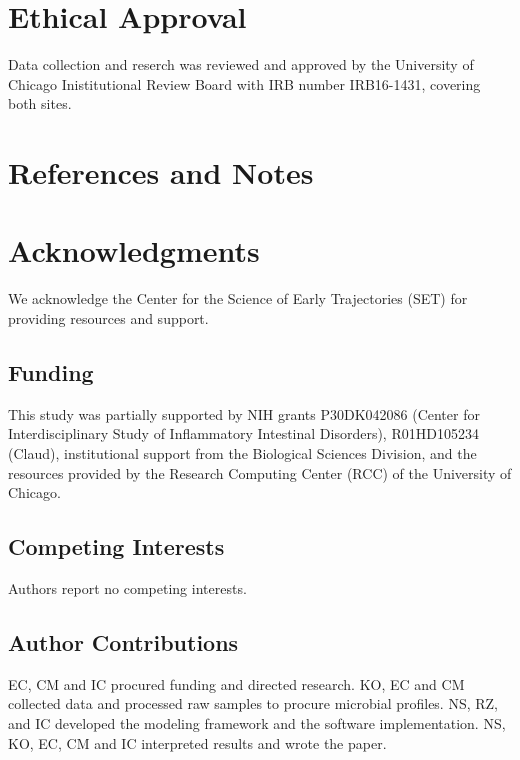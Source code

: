 \documentclass[onecolumn,10pt]{IEEEtran}
\begin{document}
\section{Ethical Approval}
Data collection and reserch was reviewed and approved by the University of Chicago Inistitutional Review Board
with IRB number IRB16-1431, covering both sites.


\def\refname{}


 



\section*{References and Notes} 



\section*{Acknowledgments}
We acknowledge the Center for the Science of Early Trajectories (SET) for providing resources and support.


\subsection*{Funding}

This study was partially supported by NIH grants P30DK042086 (Center for Interdisciplinary Study of Inflammatory Intestinal Disorders), R01HD105234 (Claud),  institutional support from the Biological Sciences Division,  and the resources provided by the  Research Computing Center (RCC) of the University of Chicago.


\subsection*{Competing Interests}
Authors report no competing interests.


\subsection*{Author Contributions}
EC, CM and IC procured funding and directed research.
KO, EC and CM collected data and processed raw samples to procure microbial profiles.
NS, RZ, and  IC  developed the modeling framework and the software implementation.
NS, KO, EC, CM and IC interpreted results and wrote the paper.
\end{document}
